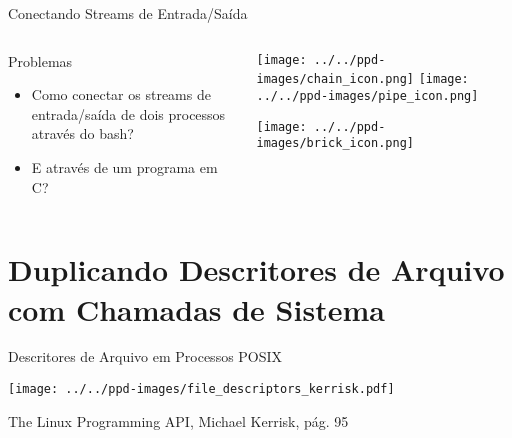 \documentclass[10pt, compress, aspectratio=169, xcolor={table,usenames,dvipsnames}]{beamer}
\begin{document}
\begin{frame}[label={sec:orgd70ddde}]{Conectando Streams de Entrada/Saída}
\begin{columns}
\begin{column}{0.6\columnwidth}
\begin{block}{Problemas}
\begin{itemize}
\item Como \alert{conectar os streams} de entrada/saída de dois processos através do bash?
\item E através de um \alert{programa em C}?
\end{itemize}
\end{block}
\end{column}
\begin{column}{0.4\columnwidth}
\begin{center}
  \texttt{[image: ../../ppd-images/chain\_icon.png]}
  \texttt{[image: ../../ppd-images/pipe\_icon.png]}

  \vspace{1em}

  \texttt{[image: ../../ppd-images/brick\_icon.png]}
\end{center}
\end{column}
\end{columns}
\end{frame}
\section{Duplicando Descritores de Arquivo com Chamadas de Sistema}
\label{sec:orgf3a999a}
\begin{frame}[label={sec:orgddf7649}]{Descritores de Arquivo em Processos POSIX}
\begin{center}
\texttt{[image: ../../ppd-images/file\_descriptors\_kerrisk.pdf]}
\end{center}

\begin{center}
\scriptsize
The Linux Programming API, Michael Kerrisk, pág. 95
\end{center}
\end{frame}
\end{document}
